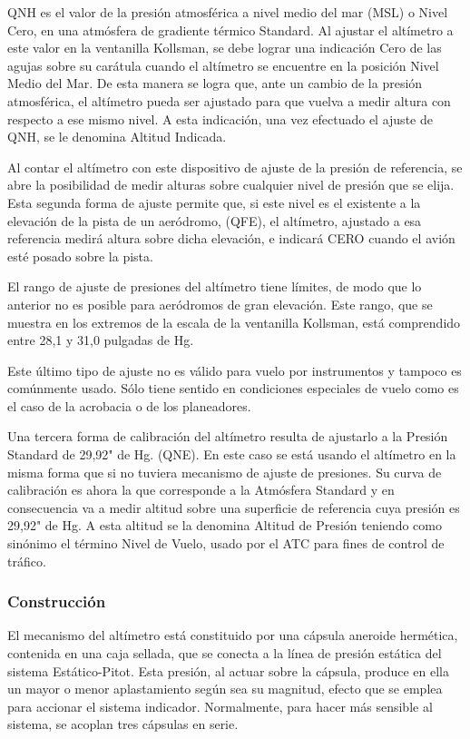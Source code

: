 \documentclass{article}
\begin{document}
QNH es el valor de la presión atmosférica a nivel medio del mar (MSL) o Nivel Cero, en una atmósfera de gradiente térmico Standard. Al ajustar el altímetro a este valor en la ventanilla Kollsman, se debe lograr una indicación Cero de las agujas sobre su carátula cuando el altímetro se encuentre en la posición Nivel Medio del Mar. De esta manera se logra que, ante un cambio de la presión atmosférica, el altímetro pueda ser ajustado para que vuelva a medir altura con respecto a ese mismo nivel. A esta indicación, una vez efectuado el ajuste de QNH, se le denomina Altitud Indicada.

Al contar el altímetro con este dispositivo de ajuste de la presión de referencia, se abre la posibilidad de medir alturas sobre cualquier nivel de presión que se elija. Esta segunda forma de ajuste permite que, si este nivel es el existente a la elevación de la pista de un aeródromo, (QFE), el altímetro, ajustado a esa referencia medirá altura sobre dicha elevación, e indicará CERO cuando el 
avión esté posado sobre la pista.

El rango de ajuste de presiones del altímetro tiene límites, de modo que lo anterior no es posible para aeródromos de gran elevación. Este rango, que se muestra en los extremos de la escala de la ventanilla Kollsman, está comprendido entre 28,1 y 31,0 pulgadas de Hg.

Este último tipo de ajuste no es válido para vuelo por instrumentos y tampoco es comúnmente usado. Sólo tiene sentido en condiciones especiales de vuelo como es el caso de la acrobacia o de los planeadores.

Una tercera forma de calibración del altímetro resulta de ajustarlo a la Presión Standard de 29,92" de Hg. (QNE). En este caso se está usando el altímetro en la misma forma que si no tuviera mecanismo de ajuste de presiones. Su curva de calibración es ahora la que corresponde a la Atmósfera Standard y en consecuencia va a medir altitud sobre una superficie de referencia cuya presión es 29,92" de Hg. A esta altitud se la denomina Altitud de Presión teniendo como sinónimo el término Nivel de Vuelo, usado por el ATC para fines de control de tráfico.

\subsubsection*{Construcción}
El mecanismo del altímetro está constituido por una cápsula aneroide hermética, contenida en una caja sellada, que se conecta a la línea de presión estática del sistema Estático-Pitot. Esta presión, al actuar sobre la cápsula, produce en ella un mayor o menor aplastamiento según sea su magnitud, efecto que se emplea para accionar el sistema indicador.
Normalmente, para hacer más sensible al sistema, se acoplan tres cápsulas en serie.
\end{document}
